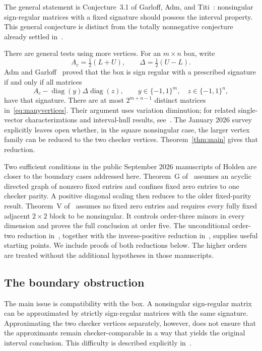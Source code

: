 \documentclass[11pt]{article}
\theoremstyle{definition}
\theoremstyle{remark}
\numberwithin{equation}{section}
\DeclareMathOperator{\diag}{diag}
\begin{document}
The general statement is Conjecture~3.1 of Garloff, Adm, and
Titi~\cite[p.~7]{Survey2016}: nonsingular sign-regular matrices with a
fixed signature should possess the interval property. This general
conjecture is distinct from the totally nonnegative conjecture already
settled in~\cite{AdmGarloff2013}.

There are general tests using more vertices. For an $m\times n$ box,
write
\[
 A_c=\tfrac12(L+U),\qquad \Delta=\tfrac12(U-L).
\]
Adm and Garloff~\cite[Theorem~3.1]{AdmGarloff2025} proved that the box
is sign regular with a prescribed signature if and only if all matrices
\begin{equation}\label{eq:manyvertices}
 A_c-\diag(y)\Delta\diag(z),
 \qquad y\in\{-1,1\}^m,\quad z\in\{-1,1\}^n,
\end{equation}
have that signature. There are at most $2^{m+n-1}$ distinct matrices
in~\eqref{eq:manyvertices}. Their argument uses variation diminution;
for related single-vector characterizations and interval-hull results,
see~\cite{ChoudhuryKannanKhare2021,ChoudhuryYadav2025}.
The January 2026 survey~\cite{AdmGarloff2026} explicitly leaves open
whether, in the square nonsingular case, the larger vertex family can
be reduced to the two checker vertices. Theorem~\ref{thm:main} gives
that reduction.

Two sufficient conditions in the public September 2026 manuscripts of
Holden are closer to the boundary cases addressed here.
Theorem~G of~\cite{HoldenGraph2026} assumes an acyclic directed graph
of nonzero fixed entries and confines fixed zero entries to one checker
parity. A positive diagonal scaling then reduces to the older
fixed-parity result. Theorem~V of~\cite{HoldenFive2026} assumes no fixed
zero entries and requires every fully fixed adjacent $2\times2$ block
to be nonsingular. It controls order-three minors in every dimension
and proves the full conclusion at order five. The unconditional
order-two reduction in~\cite{HoldenTwo2026}, together with the
inverse-positive reduction in~\cite{HoldenGraph2026}, supplies useful
starting points. We include proofs of both reductions below. The higher
orders are treated without the additional hypotheses in those manuscripts.

\subsection{The boundary obstruction}

The main issue is compatibility with the box. A nonsingular
sign-regular matrix can be approximated by strictly sign-regular
matrices with the same signature. Approximating the two checker
vertices separately, however, does not ensure that the approximants
remain checker-comparable in a way that yields the original interval
conclusion. This difficulty is described explicitly
in~\cite{AdmGarloff2026}.
\end{document}
